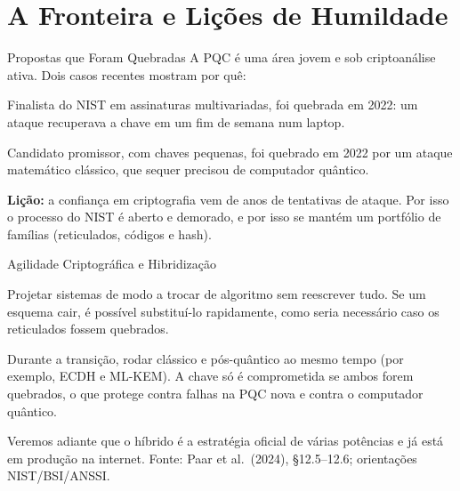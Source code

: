 \documentclass{beamer}
\begin{document}
\section{A Fronteira e Lições de Humildade}

\begin{frame}{Propostas que Foram Quebradas}
    A PQC é uma área jovem e sob criptoanálise ativa. Dois casos recentes mostram por quê:
    \medskip
    \begin{tcolorbox}[colback=red!5,colframe=red!60!black,boxrule=0.5pt,title={\footnotesize Multivariada (Rainbow)}]
        \footnotesize
        Finalista do NIST em assinaturas multivariadas, foi quebrada em 2022: um ataque recuperava a chave em um fim de semana num laptop.
    \end{tcolorbox}
    \medskip
    \begin{tcolorbox}[colback=red!5,colframe=red!60!black,boxrule=0.5pt,title={\footnotesize Isogenias (SIKE)}]
        \footnotesize
        Candidato promissor, com chaves pequenas, foi quebrado em 2022 por um ataque matemático clássico, que sequer precisou de computador quântico.
    \end{tcolorbox}
    \medskip
    \begin{tcolorbox}[colback=blue!5,colframe=blue!50!black,boxrule=0.5pt]
        \footnotesize
        \textbf{Lição:} a confiança em criptografia vem de anos de tentativas de ataque. Por isso o processo do NIST é aberto e demorado, e por isso se mantém um portfólio de famílias (reticulados, códigos e hash).
    \end{tcolorbox}
\end{frame}

\begin{frame}{Agilidade Criptográfica e Hibridização}
    \begin{tcolorbox}[colback=green!6,colframe=green!50!black,boxrule=0.5pt,title={\footnotesize Agilidade criptográfica (\textit{crypto-agility})}]
        \footnotesize
        Projetar sistemas de modo a trocar de algoritmo sem reescrever tudo. Se um esquema cair, é possível substituí-lo rapidamente, como seria necessário caso os reticulados fossem quebrados.
    \end{tcolorbox}
    \medskip
    \begin{tcolorbox}[colback=blue!5,colframe=blue!50!black,boxrule=0.5pt,title={\footnotesize Abordagem híbrida}]
        \footnotesize
        Durante a transição, rodar clássico e pós-quântico ao mesmo tempo (por exemplo, ECDH e ML-KEM). A chave só é comprometida se ambos forem quebrados, o que protege contra falhas na PQC nova e contra o computador quântico.
    \end{tcolorbox}
    \medskip
    {\footnotesize Veremos adiante que o híbrido é a estratégia oficial de várias potências e já está em produção na internet.}
    \smallskip
    {\tiny Fonte: Paar et al.\ (2024), §12.5--12.6; orientações NIST/BSI/ANSSI.}
\end{frame}
\end{document}
